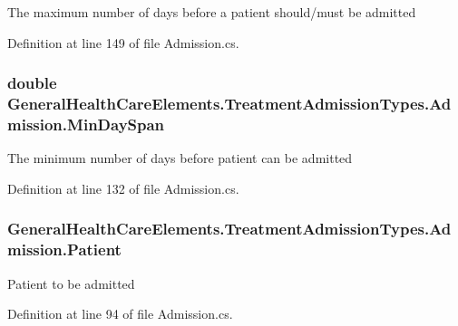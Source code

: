 The maximum number of days before a patient should/must be admitted 



Definition at line 149 of file Admission.\+cs.

\subsubsection[{\texorpdfstring{Min\+Day\+Span}{MinDaySpan}}]{\setlength{\rightskip}{0pt plus 5cm}double General\+Health\+Care\+Elements.\+Treatment\+Admission\+Types.\+Admission.\+Min\+Day\+Span\hspace{0.3cm}{\ttfamily [get]}}\hypertarget{class_general_health_care_elements_1_1_treatment_admission_types_1_1_admission_a736d7e095899a6615b5c042d08d5d3d5}{}\label{class_general_health_care_elements_1_1_treatment_admission_types_1_1_admission_a736d7e095899a6615b5c042d08d5d3d5}


The minimum number of days before patient can be admitted 



Definition at line 132 of file Admission.\+cs.

\subsubsection[{\texorpdfstring{Patient}{Patient}}]{ General\+Health\+Care\+Elements.\+Treatment\+Admission\+Types.\+Admission.\+Patient\hspace{0.3cm}{\ttfamily [get]}}\hypertarget{class_general_health_care_elements_1_1_treatment_admission_types_1_1_admission_a333bd6d10c22734e4adefde383ccdb3f}{}\label{class_general_health_care_elements_1_1_treatment_admission_types_1_1_admission_a333bd6d10c22734e4adefde383ccdb3f}


Patient to be admitted 



Definition at line 94 of file Admission.\+cs.

